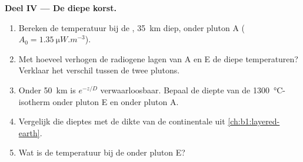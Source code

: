 \begin{problem}
\noindent\textbf{Deel IV --- De diepe korst.}
\begin{enumerate}[resume]
  \item Bereken de temperatuur bij de , \qty{35}{km} diep, onder pluton A ($A_0 = \qty{1.35}{\micro W.m^{-3}}$).
  \item Met hoeveel verhogen de radiogene lagen van A en E de diepe temperaturen? Verklaar het verschil tussen de twee plutons.
  \item Onder \qty{50}{km} is $e^{-z/D}$ verwaarloosbaar. Bepaal de diepte van de \qty{1300}{\degreeCelsius}-isotherm onder pluton E en onder pluton A.
  \item Vergelijk die dieptes met de dikte van de continentale  uit \cref{ch:b1:layered-earth}.
  \item Wat is de temperatuur bij de  onder pluton E?
\end{enumerate}
\end{problem}
